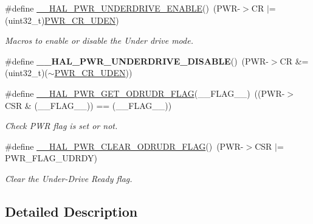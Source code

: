 \begin{DoxyCompactItemize}
\item 
\#define \hyperlink{group___p_w_r_ex___exported___constants_gafbaac4011a44566b0ba2a563736cca09}{\+\_\+\+\_\+\+H\+A\+L\+\_\+\+P\+W\+R\+\_\+\+U\+N\+D\+E\+R\+D\+R\+I\+V\+E\+\_\+\+E\+N\+A\+B\+LE}()~(P\+WR-\/$>$CR $\vert$= (uint32\+\_\+t)\hyperlink{group___peripheral___registers___bits___definition_ga150acdf90bcc4c040af0d1f5e1055f4a}{P\+W\+R\+\_\+\+C\+R\+\_\+\+U\+D\+EN})
\begin{DoxyCompactList}\small\item\em Macros to enable or disable the Under drive mode. \end{DoxyCompactList}\item 
\#define {\bfseries \+\_\+\+\_\+\+H\+A\+L\+\_\+\+P\+W\+R\+\_\+\+U\+N\+D\+E\+R\+D\+R\+I\+V\+E\+\_\+\+D\+I\+S\+A\+B\+LE}()~(P\+WR-\/$>$CR \&= (uint32\+\_\+t)($\sim$\hyperlink{group___peripheral___registers___bits___definition_ga150acdf90bcc4c040af0d1f5e1055f4a}{P\+W\+R\+\_\+\+C\+R\+\_\+\+U\+D\+EN}))\hypertarget{group___p_w_r_ex___exported___constants_ga207c042d72bfea9979134c54c4f81275}{}\label{group___p_w_r_ex___exported___constants_ga207c042d72bfea9979134c54c4f81275}

\item 
\#define \hyperlink{group___p_w_r_ex___exported___constants_ga846a66516ac8a6212f414f3d801169f9}{\+\_\+\+\_\+\+H\+A\+L\+\_\+\+P\+W\+R\+\_\+\+G\+E\+T\+\_\+\+O\+D\+R\+U\+D\+R\+\_\+\+F\+L\+AG}(\+\_\+\+\_\+\+F\+L\+A\+G\+\_\+\+\_\+)~((P\+WR-\/$>$C\+SR \& (\+\_\+\+\_\+\+F\+L\+A\+G\+\_\+\+\_\+)) == (\+\_\+\+\_\+\+F\+L\+A\+G\+\_\+\+\_\+))
\begin{DoxyCompactList}\small\item\em Check P\+WR flag is set or not. \end{DoxyCompactList}\item 
\#define \hyperlink{group___p_w_r_ex___exported___constants_ga474f22f28c87cc54df405d83852fcac1}{\+\_\+\+\_\+\+H\+A\+L\+\_\+\+P\+W\+R\+\_\+\+C\+L\+E\+A\+R\+\_\+\+O\+D\+R\+U\+D\+R\+\_\+\+F\+L\+AG}()~(P\+WR-\/$>$C\+SR $\vert$= P\+W\+R\+\_\+\+F\+L\+A\+G\+\_\+\+U\+D\+R\+DY)
\begin{DoxyCompactList}\small\item\em Clear the Under-\/\+Drive Ready flag. \end{DoxyCompactList}\end{DoxyCompactItemize}


\subsection{Detailed Description}


